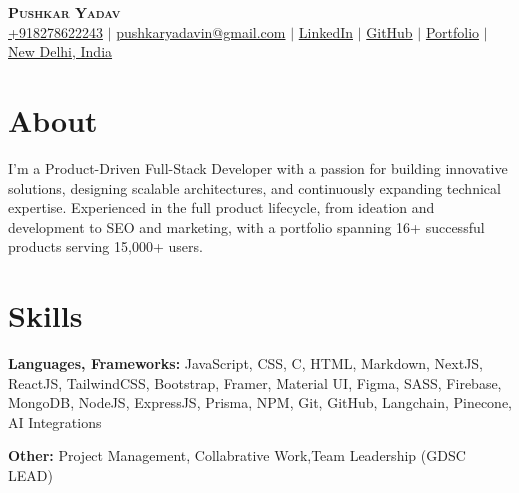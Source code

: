 \documentclass[letterpaper,11pt]{article}
\newcommand{\resumeSubHeadingListStart}{\begin{itemize}[leftmargin=0.15in, label={}]}
\newcommand{\resumeSubHeadingListEnd}{\end{itemize}}
\begin{document}

\begin{center}
    \textbf{\Huge \scshape Pushkar Yadav} \\ \vspace{3pt}
    \small
    \faMobile \hspace{.5pt} \href{tel:918278622243}{+918278622243}
    $|$
    \faAt \hspace{.5pt} \href{mailto:pushkaryadavin@gmail.com}{pushkaryadavin@gmail.com}
    $|$
    \faLinkedinSquare \hspace{.5pt} \href{https://www.linkedin.com/in/pushkarydv/}{LinkedIn}
    $|$
    \faGithub \hspace{.5pt} \href{http://github.com/pushkarydv}{GitHub}
    $|$
    \faGlobe \hspace{.5pt} \href{https://pushkaryadav.in}{Portfolio}
    $|$
    \faMapMarker \hspace{.5pt} \href{https://www.google.com/maps/place/new+delhi+india/data=!4m2!3m1!1s0x390cfd5b347eb62d:0x52c2b7494e204dce?sa=X&ved=1t:155783&ictx=111}{New Delhi, India}
\end{center}


\section{About}
  \vspace{2pt}
  \resumeSubHeadingListStart
    \small{\item{

        \textbf{}{ I'm a Product-Driven Full-Stack Developer with a passion for building innovative solutions, designing scalable architectures, and continuously expanding technical expertise. Experienced in the full product lifecycle, from ideation and development to SEO and marketing, with a portfolio spanning 16+ successful products serving 15,000+ users.
        }

    }}
    \resumeSubHeadingListEnd




\section{Skills}
  \vspace{2pt}
  \resumeSubHeadingListStart
    \small{\item{
    
       
         \textbf{Languages, Frameworks:}{ JavaScript, CSS, C, HTML, Markdown, NextJS, ReactJS, TailwindCSS, Bootstrap, Framer, Material UI, Figma, SASS, Firebase, MongoDB, NodeJS, ExpressJS, Prisma, NPM, Git, GitHub, Langchain, Pinecone, AI Integrations} \\ \vspace{3pt}
        
        \textbf{Other:}{ Project Management, Collabrative Work,Team Leadership (GDSC LEAD) } \\ \vspace{3pt}
        
        
    }}
  \resumeSubHeadingListEnd
\end{document}
